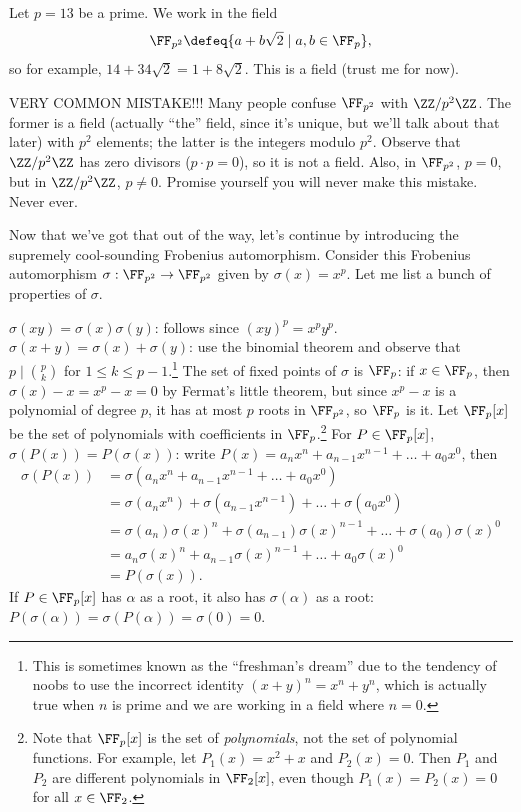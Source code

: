 \documentclass[11pt]{scrartcl}
\begin{document}
\begin{solution}{}
    Let $p = 13$ be a prime. We work in the field
    \[\FF_{p^2} \defeq \{a + b\sqrt2 \mid a,b \in \FF_p\},\]
    so for example, $14 + 34\sqrt 2 = 1 + 8\sqrt2$. This is a field (trust me for now).

    \alert{VERY COMMON MISTAKE!!!} Many people confuse $\FF_{p^2}$ with $\ZZ/p^2\ZZ$. The former is a field (actually ``the'' field, since it's unique, but we'll talk about that later) with $p^2$ elements; the latter is the integers modulo $p^2$. Observe that $\ZZ/p^2\ZZ$ has zero divisors ($p \cdot p = 0$), so it is not a field. Also, in $\FF_{p^2}$, $p = 0$, but in $\ZZ/p^2\ZZ$, $p \neq 0$. Promise yourself you will never make this mistake. Never ever.
    
    Now that we've got that out of the way, let's continue by introducing the supremely cool-sounding Frobenius automorphism. Consider this Frobenius automorphism $\sigma: \FF_{p^2} \to \FF_{p^2}$ given by $\sigma(x) = x^p$. Let me list a bunch of properties of $\sigma$.
    \begin{itemize}
        \ii $\sigma(xy) = \sigma(x)\sigma(y)$: follows since $(xy)^p = x^py^p$.
        \ii $\sigma(x + y) = \sigma(x) + \sigma(y)$: use the binomial theorem and observe that $p \mid \binom pk$ for $1 \le k \le p - 1$.\footnote{This is sometimes known as the ``freshman's dream'' due to the tendency of noobs to use the incorrect identity $(x + y)^n = x^n + y^n$, which is actually true when $n$ is prime and we are working in a field where $n = 0$.}
        \ii The set of fixed points of $\sigma$ is $\FF_p$: if $x \in \FF_p$, then $\sigma(x) - x = x^p - x = 0$ by Fermat's little theorem, but since $x^p - x$ is a polynomial of degree $p$, it has at most $p$ roots in $\FF_{p^2}$, so $\FF_p$ is it.
        \ii Let $\FF_p[x]$ be the set of polynomials with coefficients in $\FF_p$.\footnote{Note that $\FF_p[x]$ is the set of \emph{polynomials}, not the set of polynomial functions. For example, let $P_1(x) = x^2 + x$ and $P_2(x) = 0$. Then $P_1$ and $P_2$ are different polynomials in $\FF_2[x]$, even though $P_1(x) = P_2(x) = 0$ for all $x \in \FF_2$.} For $P \in \FF_p[x]$, $\sigma(P(x)) = P(\sigma(x))$: write $P(x) = a_nx^n + a_{n - 1}x^{n - 1} + \dots + a_0x^0$, then
        \begin{align*}
            \sigma(P(x)) &= \sigma(a_nx^n + a_{n - 1}x^{n - 1} + \dots + a_0x^0) \\
            &= \sigma(a_nx^n) + \sigma(a_{n - 1}x^{n - 1}) + \dots + \sigma(a_0x^0) \\
            &= \sigma(a_n)\sigma(x)^n + \sigma(a_{n - 1})\sigma(x)^{n - 1} + \dots + \sigma(a_0)\sigma(x)^0 \\
            &= a_n\sigma(x)^n + a_{n - 1}\sigma(x)^{n - 1} + \dots + a_0\sigma(x)^0 \\
            &= P(\sigma(x)).
        \end{align*}
        \ii If $P \in \FF_p[x]$ has $\alpha$ as a root, it also has $\sigma(\alpha)$ as a root: $P(\sigma(\alpha)) = \sigma(P(\alpha)) = \sigma(0) = 0$.
    \end{itemize}
    

\end{solution}
\end{document}
